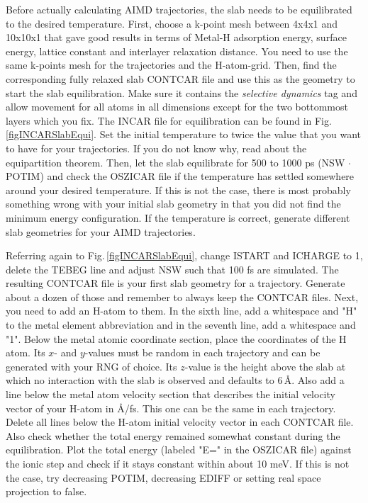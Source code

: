 \documentclass[twoside, 11pt, titlepage, captions=nooneline, a4paper, headsepline]{scrbook}%
\newcommand{\9}{\mathrm}
\newcommand{\0}{\,\mathrm}
\begin{document}
Before actually calculating AIMD trajectories, the slab needs to be equilibrated to the desired temperature. First, choose a k-point mesh between 4x4x1 and 10x10x1 that gave good results in terms of Metal-H adsorption energy, surface energy, lattice constant and interlayer relaxation distance. You need to use the same k-points mesh for the trajectories and the H-atom-grid. Then, find the corresponding fully relaxed slab CONTCAR file and use this as the geometry to start the slab equilibration. Make sure it contains the \textit{selective dynamics} tag and allow movement for all atoms in all dimensions except for the two bottommost layers which you fix. The INCAR file for equilibration can be found in Fig.\,\ref{figINCARSlabEqui}. Set the initial temperature to twice the value that you want to have for your trajectories. If you do not know why, read about the equipartition theorem. Then, let the slab equilibrate for 500 to 1000 ps (NSW $\cdot$ POTIM) and check the OSZICAR file if the temperature has settled somewhere around your desired temperature. If this is not the case, there is most probably something wrong with your initial slab geometry in that you did not find the minimum energy configuration. If the temperature is correct, generate different slab geometries for your AIMD trajectories.

Referring again to Fig.\,\ref{figINCARSlabEqui}, change ISTART and ICHARGE to 1, delete the TEBEG line and adjust NSW such that 100 fs are simulated. The resulting CONTCAR file is your first slab geometry for a trajectory. Generate about a dozen of those and remember to always keep the CONTCAR files. Next, you need to add an H-atom to them. In the sixth line, add a whitespace and "H" to the metal element abbreviation and in the seventh line, add a whitespace and "1". Below the metal atomic coordinate section, place the coordinates of the H atom. Its $x$- and $y$-values must be random in each trajectory and can be generated with your RNG of choice. Its $z$-value is the height above the slab at which no interaction with the slab is observed and defaults to 6\,\AA. Also add a line below the metal atom velocity section that describes the initial velocity vector of your H-atom in \AA/fs. This one can be the same in each trajectory. Delete all lines below the H-atom initial velocity vector in each CONTCAR file. Also check whether the total energy remained somewhat constant during the equilibration. Plot the total energy (labeled "E=" in the OSZICAR file) against the ionic step and check if it stays constant within about 10 meV. If this is not the case, try decreasing POTIM, decreasing EDIFF or setting real space projection to false.
\end{document}
